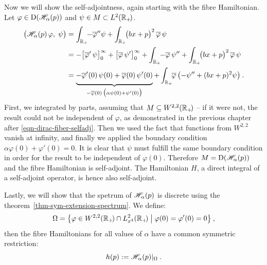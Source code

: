 Now we will show the self-adjointness, again starting with the fibre Hamiltonian. Let $\varphi \in \mathrm{D}(\mathscr{H}_\alpha(p))$ and $\psi \in M \subset L^2(\mathbb{R}_+\!)$.
\begin{align*}
    \big(\Hf_\alpha(p) \, \varphi, \; \psi \big)
    &= \int_{\R_+}\!\! -\overline\varphi'' \psi + \int_{\R_+}\!\! \big(bx + p\big)^2 \, \overline\varphi \, \psi \\
    &= - \big[ \overline\varphi' \, \psi \big]_0^\infty
    + \big[ \overline\varphi \, \psi' \big]_0^\infty
    + \int_{\R_+}\!\! -\overline\varphi \, \psi'' + \int_{\R_+}\!\! \big(bx + p\big)^2 \, \overline\varphi \, \psi \\
    &= \underbrace{
        - \overline\varphi'(0) \, \psi(0)
        + \overline\varphi(0) \, \psi'(0)
        \vphantom{\Big|}
    }_{
        -\overline\varphi(0) \,
        \big( \alpha \psi(0) + \psi'(0) \big)
    }
    + \int_{\R_+}\!\! \overline\varphi \, \big( {-\psi''} + (bx+p)^2 \psi \big) \: .
\end{align*}
First, we integrated by parts, assuming that $M\subseteq W^{2,2}(\mathbb{R}_+\!)$ ­– if it were not, the result could not be independent of $\varphi$, as demonstrated in the previous chapter after \eqref{eqn-dirac-fiber-selfadj}. Then we used the fact that functions from $W^{2,2}$ vanish at infinity, and finally we applied the boundary condition $\alpha \varphi(0) + \varphi'(0) = 0$. It is clear that $\psi$ must fulfill the same boundary condition in order for the result to be independent of $\varphi(0)$. Therefore $M=\mathrm{D}(\mathscr{H}_\alpha(p))$ and the fibre Hamiltonian is self-adjoint. The Hamiltonian $H$, a direct integral of a self-adjoint operator, is hence also self-adjoint.

Lastly, we will show that the spetrum of $\mathscr{H}_\alpha(p)$ is discrete using the theorem~\ref{thm-sym-extension-spectrum}. We define:
\begin{equation*}
    \Omega = \big\{ \varphi \in W^{2,2}(\mathbb{R}_+\!) \cap L^2_{x^4}(\mathbb{R}_+\!) \;\big|\; \varphi(0) = \varphi'(0) = 0 \big\}
    \: ,
\end{equation*}
then the fibre Hamiltonians for all values of $\alpha$ have a common symmetric restriction:
\begin{equation*}
    h(p) := \mathscr{H}_\alpha(p) |_\Omega
    \: .
\end{equation*}

